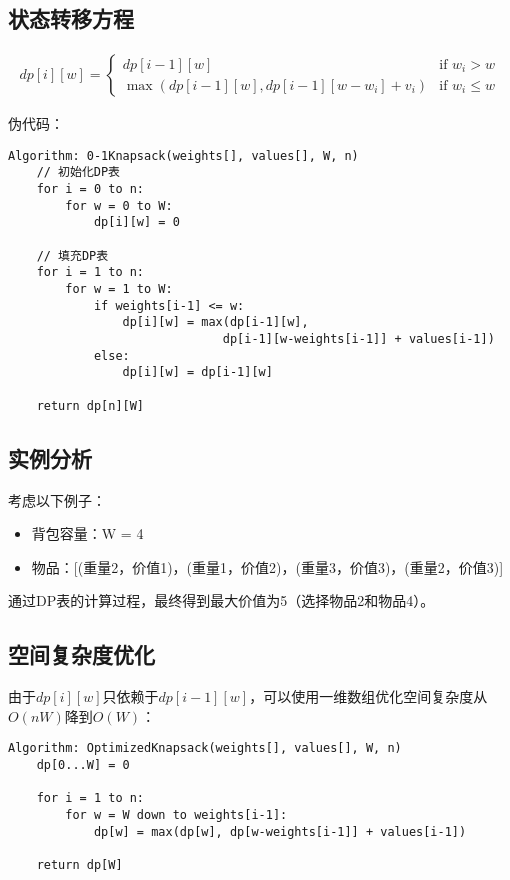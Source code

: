\subsection{状态转移方程}
\begin{align}
dp[i][w] = \begin{cases}
dp[i-1][w] & \text{if } w_i > w \\
\max(dp[i-1][w], dp[i-1][w-w_i] + v_i) & \text{if } w_i \leq w
\end{cases}
\end{align}

伪代码：
\begin{verbatim}
Algorithm: 0-1Knapsack(weights[], values[], W, n)
    // 初始化DP表
    for i = 0 to n:
        for w = 0 to W:
            dp[i][w] = 0
    
    // 填充DP表
    for i = 1 to n:
        for w = 1 to W:
            if weights[i-1] <= w:
                dp[i][w] = max(dp[i-1][w], 
                              dp[i-1][w-weights[i-1]] + values[i-1])
            else:
                dp[i][w] = dp[i-1][w]
    
    return dp[n][W]
\end{verbatim}

\subsection{实例分析}
考虑以下例子：
\begin{itemize}
\item 背包容量：W = 4
\item 物品：[(重量2，价值1)，(重量1，价值2)，(重量3，价值3)，(重量2，价值3)]
\end{itemize}

通过DP表的计算过程，最终得到最大价值为5（选择物品2和物品4）。

\subsection{空间复杂度优化}
由于$dp[i][w]$只依赖于$dp[i-1][w]$，可以使用一维数组优化空间复杂度从$O(nW)$降到$O(W)$：

\begin{verbatim}
Algorithm: OptimizedKnapsack(weights[], values[], W, n)
    dp[0...W] = 0
    
    for i = 1 to n:
        for w = W down to weights[i-1]:
            dp[w] = max(dp[w], dp[w-weights[i-1]] + values[i-1])
    
    return dp[W]
\end{verbatim}


